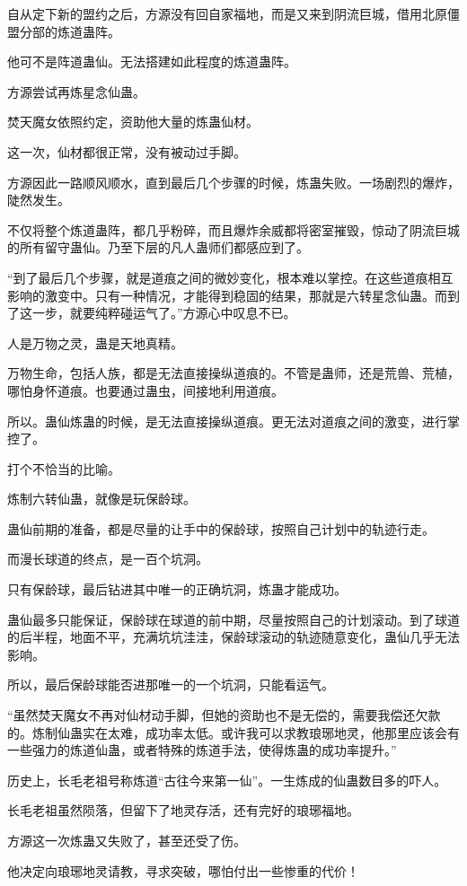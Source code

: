 \begin{this_body}
自从定下新的盟约之后，方源没有回自家福地，而是又来到阴流巨城，借用北原僵盟分部的炼道蛊阵。

他可不是阵道蛊仙。无法搭建如此程度的炼道蛊阵。

方源尝试再炼星念仙蛊。

焚天魔女依照约定，资助他大量的炼蛊仙材。

这一次，仙材都很正常，没有被动过手脚。

方源因此一路顺风顺水，直到最后几个步骤的时候，炼蛊失败。一场剧烈的爆炸，陡然发生。

不仅将整个炼道蛊阵，都几乎粉碎，而且爆炸余威都将密室摧毁，惊动了阴流巨城的所有留守蛊仙。乃至下层的凡人蛊师们都感应到了。

“到了最后几个步骤，就是道痕之间的微妙变化，根本难以掌控。在这些道痕相互影响的激变中。只有一种情况，才能得到稳固的结果，那就是六转星念仙蛊。而到了这一步，就要纯粹碰运气了。”方源心中叹息不已。

人是万物之灵，蛊是天地真精。

万物生命，包括人族，都是无法直接操纵道痕的。不管是蛊师，还是荒兽、荒植，哪怕身怀道痕。也要通过蛊虫，间接地利用道痕。

所以。蛊仙炼蛊的时候，是无法直接操纵道痕。更无法对道痕之间的激变，进行掌控了。

打个不恰当的比喻。

炼制六转仙蛊，就像是玩保龄球。

蛊仙前期的准备，都是尽量的让手中的保龄球，按照自己计划中的轨迹行走。

而漫长球道的终点，是一百个坑洞。

只有保龄球，最后钻进其中唯一的正确坑洞，炼蛊才能成功。

蛊仙最多只能保证，保龄球在球道的前中期，尽量按照自己的计划滚动。到了球道的后半程，地面不平，充满坑坑洼洼，保龄球滚动的轨迹随意变化，蛊仙几乎无法影响。

所以，最后保龄球能否进那唯一的一个坑洞，只能看运气。

“虽然焚天魔女不再对仙材动手脚，但她的资助也不是无偿的，需要我偿还欠款的。炼制仙蛊实在太难，成功率太低。或许我可以求教琅琊地灵，他那里应该会有一些强力的炼道仙蛊，或者特殊的炼道手法，使得炼蛊的成功率提升。”

历史上，长毛老祖号称炼道“古往今来第一仙”。一生炼成的仙蛊数目多的吓人。

长毛老祖虽然陨落，但留下了地灵存活，还有完好的琅琊福地。

方源这一次炼蛊又失败了，甚至还受了伤。

他决定向琅琊地灵请教，寻求突破，哪怕付出一些惨重的代价！


\end{this_body}
